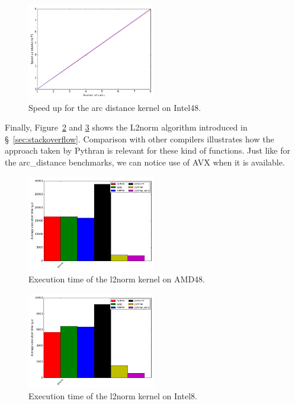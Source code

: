 \documentclass[10pt, preprint]{sigplanconf}
\begin{document}
\begin{figure}[t]
\centering
\includegraphics[width=0.5\textwidth]{arc_distance_intel8.png}
\caption{Speed up for the arc distance kernel on Intel48.}
\label{fig:arc_distance_intel8}
\end{figure}

Finally, Figure~\ref{fig:l2norme} and \ref{fig:l2norm_intel8} shows the L2norm algorithm introduced in
\S~\ref{sec:stackoverflow}. Comparison with other compilers illustrates how the
approach taken by Pythran is relevant for these kind of functions. Just like for
the arc\_distance benchmarks, we can notice use of AVX when it is available.

\begin{figure}[t]
\centering
\includegraphics[width=0.5\textwidth]{l2norm_amd48.png}
\caption{Execution time of the l2norm kernel on AMD48.}
\label{fig:l2norme}
\end{figure}

\begin{figure}[t]
\centering
\includegraphics[width=0.5\textwidth]{l2norm_intel8.png}
\caption{Execution time of the l2norm kernel on Intel8.}
\label{fig:l2norm_intel8}
\end{figure}
\end{document}
